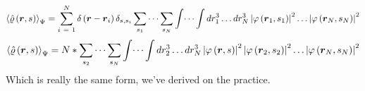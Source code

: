 \begin{equation}
\Braket{\hat{\varrho} \left( \boldsymbol{r}, s \right)}_{\Psi}
=
\sum_{i\ =\ 1}^{N} \delta \left( \boldsymbol{r} - \boldsymbol{r}_{i} \right) \delta_{s,s_{i}}
\sum_{s_{1}} \dots \sum_{s_{N}} \int \dots \int dr^{3}_{1} \dots dr^{3}_{N}
\left| \varphi \left( \boldsymbol{r}_{1}, s_{1} \right) \right|^{2}
\dots
\left| \varphi \left( \boldsymbol{r}_{N}, s_{N} \right) \right|^{2}
\end{equation}
\begin{equation}
\Braket{\hat{\varrho} \left( \boldsymbol{r}, s \right)}_{\Psi}
=
N*
\sum_{s_{2}} \dots \sum_{s_{N}} \int \dots \int dr^{3}_{2} \dots dr^{3}_{N}
\left| \varphi \left( \boldsymbol{r}, s \right) \right|^{2}
\left| \varphi \left( \boldsymbol{r}_{2}, s_{2} \right) \right|^{2}
\dots
\left| \varphi \left( \boldsymbol{r}_{N}, s_{N} \right) \right|^{2}
\end{equation}
Which is really the same form, we've derived on the practice.